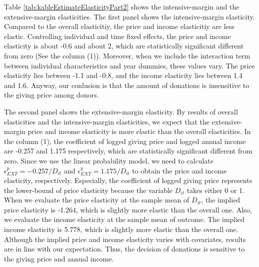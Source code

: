\documentclass[ review  , 3p ]{elsarticle}
\begin{document}
  Table \ref{tab:kableEstimateElasticityPart2} shows the intensive-margin and the extensive-margin elasticities.
  The first panel shows the intensive-margin elasticity.
  Compared to the overall elasticitiy, the price and income elasticitiy are less elastic.
  Controlling individual and time fixed effects,
  the price and income elasticity is about -0.6 and about 2,
  which are statistically significant different from zero (See the column (1)).
  Moreover, when we include the interaction term between individual characteristics and year dummies,
  these values vary.
  The price elasticity lies between -1.1 and -0.8,
  and the income elasticity lies between 1.4 and 1.6.
  Anyway, our conlusion is that the amount of donations is insensitive to the giving price among donors.

  The second panel shows the extensive-margin elasticity.
  By results of overall elasticities and the intensive-margin elasticities,
  we expect that the extensive-margin price and income elasticity is more elastic than the overall elasticities.
  In the column (1), the coefficient of logged giving price and logged annual income are -0.257 and 1.175 respectively,
  which are statistically significant different from zero.
  Since we use the linear probability model,
  we need to calculate \(\epsilon^p_{EXT} = -0.257/D_{it}\) and \(\epsilon^y_{EXT} = 1.175/D_{it}\)
  to obtain the price and income elasticity, respectively.
  Especially, the coefficient of logged giving price represents the lower-bound of price elasticity
  because the variable \(D_{it}\) takes either 0 or 1.
  When we evaluate the price elasticity at the sample mean of \(D_{it}\),
  the implied price elasticity is -1.264, which is slightly more elastic than the overall one.
  Also, we evaluate the income elasticity at the sample mean of outcome.
  The implied income elasticity is 5.778, which is slightly more elastic than the overall one.
  Although the implied price and income elasticity varies with covariates,
  results are in line with our expectation.
  Thus, the decision of donations is sensitive to the giving price and annual income.
\end{document}
